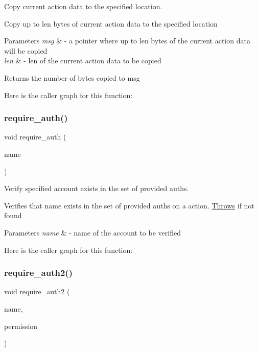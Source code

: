 Copy current action data to the specified location. 

Copy up to len bytes of current action data to the specified location 
\begin{DoxyParams}{Parameters}
{\em msg} & -\/ a pointer where up to len bytes of the current action data will be copied \\
\hline
{\em len} & -\/ len of the current action data to be copied \\
\hline
\end{DoxyParams}
\begin{DoxyReturn}{Returns}
the number of bytes copied to msg 
\end{DoxyReturn}
Here is the caller graph for this function\+:
\mbox{\label{group__actioncapi_gab1e668e93ac1f94421743ed79edffb26}} 
\subsubsection{\texorpdfstring{require\+\_\+auth()}{require\_auth()}}
{\footnotesize\ttfamily void require\+\_\+auth (\begin{DoxyParamCaption}\item[{account\+\_\+name}]{name }\end{DoxyParamCaption})}



Verify specified account exists in the set of provided auths. 

Verifies that name exists in the set of provided auths on a action. \mbox{\hyperlink{struct_throws}{Throws}} if not found 
\begin{DoxyParams}{Parameters}
{\em name} & -\/ name of the account to be verified \\
\hline
\end{DoxyParams}
Here is the caller graph for this function\+:
\mbox{\label{group__actioncapi_gace44cd21e660827634c0529077f9494c}} 
\subsubsection{\texorpdfstring{require\+\_\+auth2()}{require\_auth2()}}
{\footnotesize\ttfamily void require\+\_\+auth2 (\begin{DoxyParamCaption}\item[{account\+\_\+name}]{name,  }\item[{permission\+\_\+name}]{permission }\end{DoxyParamCaption})}



